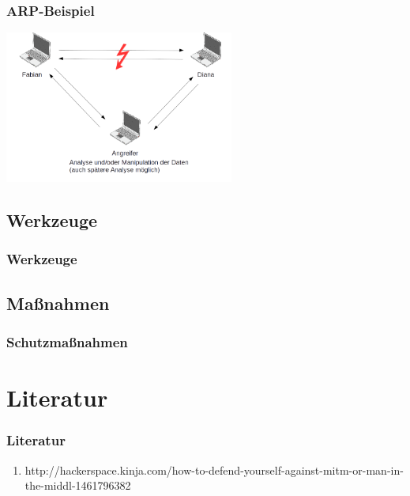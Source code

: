 \documentclass{beamer}
\begin{document}
	   	\begin{frame}
	   		\frametitle{ARP-Beispiel}
	   		\includegraphics[height=5.0cm]{ARP-Tabelle-manipuliert_1.png}
	   	\end{frame}
    	
    	\subsection*{Werkzeuge}
		\begin{frame}
        	\frametitle{Werkzeuge}
                       	
    	\end{frame}
    	\subsection*{Maßnahmen}
		\begin{frame}
        	\frametitle{Schutzmaßnahmen}
                       	
    	\end{frame}  
    	
    \section{Literatur}
    	\begin{frame}
    		\frametitle{Literatur}
    		\begin{enumerate}
    			\item http://hackerspace.kinja.com/how-to-defend-yourself-against-mitm-or-man-in-the-middl-1461796382
    		\end{enumerate}
    	\end{frame}
\end{document}
